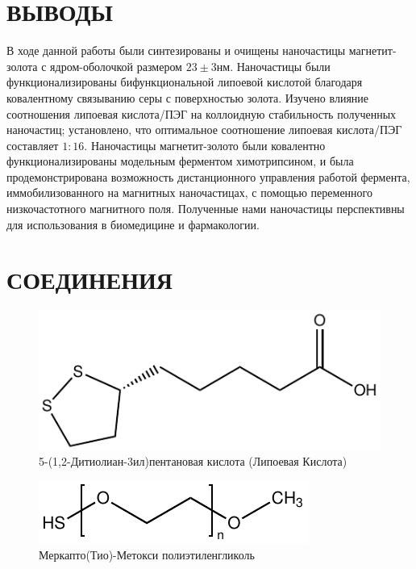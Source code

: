 \documentclass[12pt, a4paper]{article}
\begin{document}
\section*{ВЫВОДЫ}
В ходе данной работы были синтезированы и очищены наночастицы магнетит-золота с ядром-оболочкой размером \(23 \pm 3 \text{нм}\). Наночастицы были функционализированы бифункциональной липоевой кислотой благодаря ковалентному связыванию серы с поверхностью золота. Изучено влияние соотношения липоевая кислота/ПЭГ на коллоидную стабильность полученных наночастиц; установлено, что оптимальное соотношение липоевая кислота/ПЭГ составляет \(1: 16\). Наночастицы магнетит-золото были ковалентно функционализированы модельным ферментом химотрипсином, и была продемонстрирована возможность дистанционного управления работой фермента, иммобилизованного на магнитных наночастицах, с помощью переменного низкочастотного магнитного поля. Полученные нами наночастицы перспективны для использования в биомедицине и фармакологии.

\section*{СОЕДИНЕНИЯ}

\begin{figure}[ht!]
  \centering
  \includegraphics[scale=1]{lipoic.pdf}
  \captionsetup{labelformat=empty}
  \caption{5-(1,2-Дитиолиан-3ил)пентановая кислота (Липоевая Кислота)}
\end{figure}

\begin{figure}[ht!]
  \centering
  \includegraphics[scale=1]{hspegoch.pdf}
  \captionsetup{labelformat=empty}
  \caption{Меркапто(Тио)-Метокси полиэтиленгликоль}
\end{figure}
\end{document}
